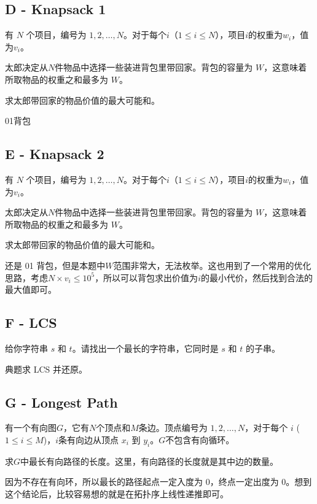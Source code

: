 \subsection{D - Knapsack 1}
\begin{framed}
    有 $N$ 个项目，编号为 $1, 2, \ldots, N$。对于每个$i$（$1 \leq i \leq N$），项目$i$的权重为$w_i$，值为$v_i$。

    太郎决定从$N$件物品中选择一些装进背包里带回家。背包的容量为 $W$，这意味着所取物品的权重之和最多为 $W$。

    求太郎带回家的物品价值的最大可能和。
\end{framed}
01背包


\subsection{E - Knapsack 2}
\begin{framed}
    有 $N$ 个项目，编号为 $1, 2, \ldots, N$。对于每个$i$（$1 \leq i \leq N$），项目$i$的权重为$w_i$，值为$v_i$。

    太郎决定从$N$件物品中选择一些装进背包里带回家。背包的容量为 $W$，这意味着所取物品的权重之和最多为 $W$。

    求太郎带回家的物品价值的最大可能和。
\end{framed}
还是 01 背包，但是本题中$W$范围非常大，无法枚举。这也用到了一个常用的优化思路，考虑$N\times v_i\le 10^5$，所以可以背包求出价值为$i$的最小代价，然后找到合法的最大值即可。


\subsection{F - LCS}
\begin{framed}
    给你字符串 $s$ 和 $t$。请找出一个最长的字符串，它同时是 $s$ 和 $t$ 的子串。
\end{framed}
典题求 LCS 并还原。


\subsection{G - Longest Path}
\begin{framed}
    有一个有向图$G$，它有$N$个顶点和$M$条边。顶点编号为 $1, 2, \ldots, N$，对于每个 $i$ ($1 \leq i \leq M$)，$i$条有向边从顶点 $x_i$ 到 $y_i$。$G$不包含有向循环。

    求$G$中最长有向路径的长度。这里，有向路径的长度就是其中边的数量。
\end{framed}
因为不存在有向环，所以最长的路径起点一定入度为 0，终点一定出度为 0。想到这个结论后，比较容易想的就是在拓扑序上线性递推即可。


